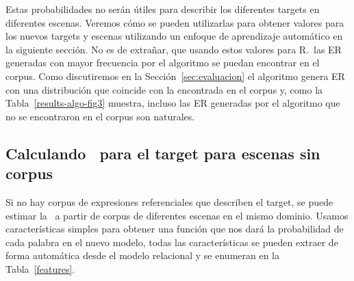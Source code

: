 Estas probabilidades no ser\'an \'utiles
para describir los diferentes targets en diferentes escenas. Veremos c\'omo se
pueden utilizarlas para obtener valores para los nuevos targets y escenas utilizando un
enfoque de aprendizaje autom\'atico en la siguiente secci\'on. No es de extra\~nar,
que usando estos valores para R.\puse\ las ER generadas con mayor frecuencia por el
algoritmo se puedan encontrar en el corpus. Como discutiremos en la Secci\'on~\ref{sec:evaluacion} el algoritmo genera ER
con una distribuci\'on que coincide con la encontrada en el corpus y, como la
Tabla~\ref{results-algo-fig3} muestra, incluso las ER generadas por el algoritmo que no se encontraron
en el corpus son naturales.





\subsection{Calculando \puse\ para el target para escenas sin corpus } 
\label{subsec:learning}

%

Si no hay corpus de expresiones referenciales que describen el target, se puede estimar la \puse~a partir de corpus de
diferentes escenas en el mismo dominio.
Usamos caracter\'isticas simples para obtener una funci\'on que nos dar\'a la probabilidad de cada palabra en el nuevo modelo, todas las caracter\'isticas se pueden extraer de forma autom\'atica desde el modelo relacional y se enumeran en la Tabla~\ref{features}.

